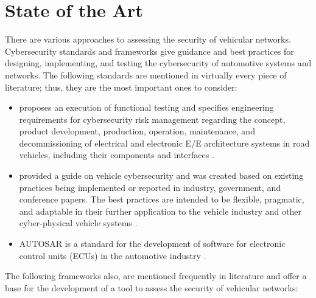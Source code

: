 \chapter{State of the Art}
\label{chp:stateoftheart}

There are various approaches to assessing the security of vehicular networks. Cybersecurity standards and frameworks give guidance and best practices for designing, implementing, and testing the cybersecurity of automotive systems and networks. 
The following standards are mentioned in virtually every piece of literature; thus, they are the most important ones to consider:

\begin{itemize}
\item proposes an execution of functional testing and specifies engineering requirements for cybersecurity risk management regarding the concept, product development, production, operation, maintenance, and decommissioning of electrical and electronic E/E architecture systems in road vehicles, including their components and interfaces \cite{iso21434}.

\item provided a guide on vehicle cybersecurity and was created based on existing practices being implemented or reported in industry, government, and conference papers. The best practices are intended to be flexible, pragmatic, and adaptable in their further application to the vehicle industry and other cyber-physical vehicle systems \cite{sae_j3061}.

\item AUTOSAR is a standard for the development of software for electronic control units (ECUs) in the automotive industry \cite{autosar}.
\end{itemize}

The following frameworks also, are mentioned frequently in literature and offer a base for the development of a tool to assess the security of vehicular networks: 


